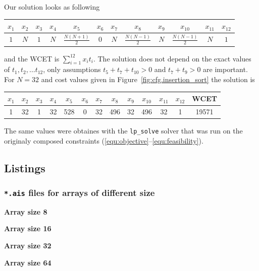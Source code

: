 \documentclass[12pt,a4paper,titlepage,oneside]{article}
\begin{document}
\begin{itemize}
Our solution looks as following
\begin{center}
\begin{tabular}{c|c|c|c|c|c|c|c|c|c|c|c}
\hline
$x_1$ & $x_2$ & $x_3$ & $x_4$ & $x_5$ & $x_6$ & $x_7$ & $x_8$ & $x_9$ & $x_{10}$ & $x_{11}$ & $x_{12}$ \\
\hline
$1$ & $N$ & $1$ & $N$ & $\frac{N(N+1)}2$ & $0$ & $N$ & $\frac{N(N-1)}2$ & $N$ & $\frac{N(N-1)}2$ & $N$ & $1$ \\
\hline
\end{tabular}
\end{center}
and the WCET is $\sum_{i=1}^{12} x_i t_i$.
The solution does not depend on the exact values of $t_1, t_2, \ldots t_{12}$, only assumptions $t_5 + t_7 + t_{10} > 0$ and $t_7+t_9 > 0$ are important.
For $N=32$ and cost values given in Figure~\ref{fig:cfg.insertion_sort} the solution is
\begin{center}
\begin{tabular}{c|c|c|c|c|c|c|c|c|c|c|c|c}
\hline
$x_1$ & $x_2$ & $x_3$ & $x_4$ & $x_5$ & $x_6$ & $x_7$ & $x_8$ & $x_9$ & $x_{10}$ & $x_{11}$ & $x_{12}$ & WCET\\
\hline
1 & 32 & 1 & 32 & 528 & 0 & 32 & 496 & 32 & 496 & 32 & 1  & 19571\\
\hline
\end{tabular}
\end{center}
The same values were obtaines with the \texttt{lp\_solve} solver that was run on the originaly composed constraints (\ref{equ:objective}--\ref{equ:feasibility}).

\end{itemize}



\subsection{Listings}

\subsubsection{\texttt{*.ais} files for arrays of different size}
\textbf{Array size 8}


\textbf{Array size 16}

\textbf{Array size 32}

\textbf{Array size 64}

\end{document}
